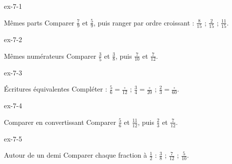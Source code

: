 \clearpage{}
\begin{blocLivre}{ex-7-1}\begin{exercice}[1]{Mêmes parts}
Comparer $\frac79$ et $\frac59$, puis ranger par ordre croissant : $\frac8{15}$ ; $\frac2{15}$ ; $\frac{11}{15}$.
\end{exercice}\end{blocLivre}
\begin{blocLivre}{ex-7-2}\begin{exercice}[1]{Mêmes numérateurs}
Comparer $\frac35$ et $\frac38$, puis $\frac7{10}$ et $\frac7{12}$.
\end{exercice}\end{blocLivre}
\begin{blocLivre}{ex-7-3}\begin{exercice}[1]{Écritures équivalentes}
Compléter : $\frac56=\frac{\square}{12}$ ; $\frac34=\frac{\square}{20}$ ; $\frac{2}{3}=\frac{\square}{60}$.
\end{exercice}\end{blocLivre}
\begin{blocLivre}{ex-7-4}\begin{exercice}[1]{Comparer en convertissant}
Comparer $\frac56$ et $\frac{11}{12}$, puis $\frac23$ et $\frac7{12}$.
\end{exercice}\end{blocLivre}
\begin{blocLivre}{ex-7-5}\begin{exercice}[1]{Autour de un demi}
Comparer chaque fraction à $\frac12$ : $\frac38$ ; $\frac7{12}$ ; $\frac5{10}$.
\end{exercice}\end{blocLivre}

